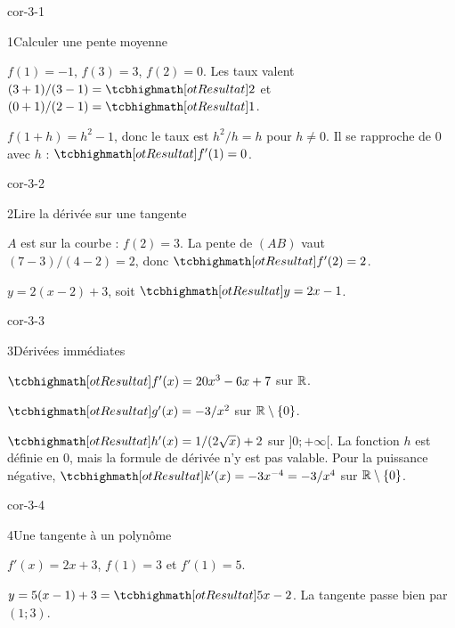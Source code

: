 \corrigesSouples

\begin{blocLivre}{cor-3-1}
\begin{corrige}{1}{Calculer une pente moyenne}
\begin{questions}
\item $f(1)=-1$, $f(3)=3$, $f(2)=0$. Les taux valent
$(3+1)/(3-1)=\res{2}$ et $(0+1)/(2-1)=\res{1}$.
\item $f(1+h)=h^2-1$, donc le taux est $h^2/h=h$ pour $h\neq0$.
Il se rapproche de 0 avec $h$ : $\res{f'(1)=0}$.
\end{questions}
\end{corrige}
\end{blocLivre}
\begin{blocLivre}{cor-3-2}
\begin{corrige}{2}{Lire la dérivée sur une tangente}
\begin{questions}\item $A$ est sur la courbe : $f(2)=3$.
La pente de $(AB)$ vaut $(7-3)/(4-2)=2$, donc $\res{f'(2)=2}$.
\item $y=2(x-2)+3$, soit $\res{y=2x-1}$.
\end{questions}
\label{figlivre-r03-02-tangente-cor}

\end{corrige}
\end{blocLivre}
\begin{blocLivre}{cor-3-3}
\begin{corrige}{3}{Dérivées immédiates}
\par
$\res{f'(x)=20x^3-6x+7}$ sur $\mathbb{R}$.\par
$\res{g'(x)=-3/x^2}$ sur $\mathbb{R}\setminus\{0\}$.\par
$\res{h'(x)=1/(2\sqrt x)+2}$ sur $]0;+\infty[$.
La fonction $h$ est définie en 0, mais la formule de dérivée n'y est pas valable.
Pour la puissance négative, $\res{k'(x)=-3x^{-4}=-3/x^4}$ sur $\mathbb{R}\setminus\{0\}$.
\end{corrige}
\end{blocLivre}
\begin{blocLivre}{cor-3-4}
\begin{corrige}{4}{Une tangente à un polynôme}
\begin{questions}\item $f'(x)=2x+3$, $f(1)=3$ et $f'(1)=5$.
\item $y=5(x-1)+3=\res{5x-2}$. La tangente passe bien par $(1;3)$.
\end{questions}
\label{figlivre-r03-04-tangente-cor}

\end{corrige}
\end{blocLivre}
